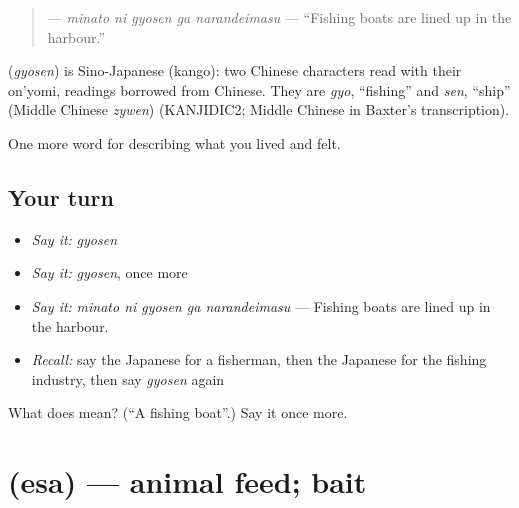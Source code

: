 \begin{quote}
\textbf{  } — \emph{minato ni gyosen ga narandeimasu} — \textquotedblleft{}Fishing boats are lined up in the harbour.\textquotedblright{}
\end{quote}

\begin{cousinweb}
\textbf{} (\emph{gyosen}) is Sino-Japanese (kango): two Chinese characters read with their on'yomi, readings borrowed from Chinese. They are \emph{gyo}, \textquotedblleft{}fishing\textquotedblright{} and \emph{sen}, \textquotedblleft{}ship\textquotedblright{} (Middle Chinese \emph{zywen}) (KANJIDIC2; Middle Chinese in Baxter's transcription).
\end{cousinweb}

\begin{grammarlens}[title={What you've built}]
One more word for describing what you lived and felt.
\end{grammarlens}

\subsection*{Your turn}
\begin{itemize}
\raggedright
  \item \emph{Say it:} \emph{gyosen}
  \item \emph{Say it:} \emph{gyosen}, once more
  \item \emph{Say it:} \emph{minato ni gyosen ga narandeimasu} — Fishing boats are lined up in the harbour.
  \item \emph{Recall:} say the Japanese for a fisherman, then the Japanese for the fishing industry, then say \emph{gyosen} again
\end{itemize}

\begin{tcolorbox}[breakable,colback=teal!4,colframe=teal!35!black,title={Before you move on}]
What does  mean? (\textquotedblleft{}A fishing boat\textquotedblright{}.) Say it once more.
\end{tcolorbox}
\section[\texorpdfstring{\ja{えさ} (esa)}{えさ (esa)}]{ (esa) — animal feed; bait}

\label{lesson:JA-C490-esa}



